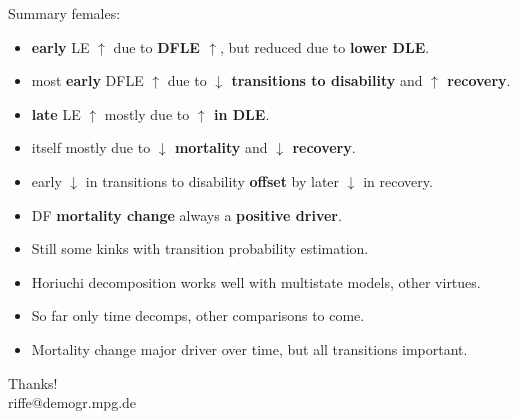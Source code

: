 \documentclass[20pt,usenames,dvipsnames]{beamer}
\begin{document}
\begin{frame}[plain]
\Large
\begin{center}
Summary females:
\begin{itemize}[<+->]
\item \textbf{early} LE $\uparrow$ due to \textbf{DFLE $\uparrow$}, but reduced due to \textbf{lower DLE}.
\item most \textbf{early} DFLE $\uparrow$ due to \textbf{$\downarrow$ transitions to disability} and \textbf{$\uparrow$ recovery}.
\item \textbf{late} LE $\uparrow$ mostly due to \textbf{$\uparrow$ in DLE}.
\item itself mostly due to \textbf{$\downarrow$ mortality} and \textbf{$\downarrow$ recovery}.
\item early $\downarrow$ in transitions to disability \textbf{offset} by later $\downarrow$ in recovery.
\item DF \textbf{mortality change} always a \textbf{positive driver}.
\end{itemize}
\end{center}
\end{frame}

\begin{frame}[plain]
\Large
\begin{center}
\begin{itemize}[<+->]
\item Still some kinks with transition probability estimation.
\item Horiuchi decomposition works well with multistate models, other virtues.
\item So far only time decomps, other comparisons to come.
\item Mortality change major driver over time, but all transitions important.
\end{itemize}
\pause
Thanks!\\
riffe@demogr.mpg.de
\end{center}
\end{frame}


\end{document}
